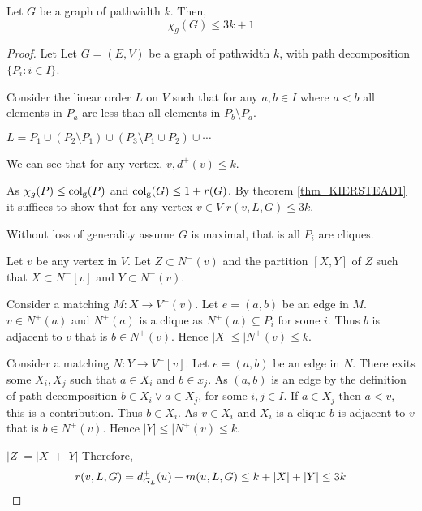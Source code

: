 \begin{theorem}\label{thm_pathwidth}
    Let $G$ be a graph of pathwidth $k$. Then, 
    \[\chi_g(G) \leq 3k + 1\]    
\end{theorem}

\begin{proof}
    Let Let $G=(E,V)$ be a graph of pathwidth $k$, with path decomposition $\{P_i:i\in I\}$. 

    Consider the linear order $L$ on $V$ such that for any $a,b\in I$ where $a<b$ all elements in $P_a$ are less than all elements in $P_b\setminus P_a$.  
        
    $ L = P_1 \cup (P_2 \setminus P_1) \cup  (P_3 \setminus P_1\cup P_2) \cup \dotsm$ 
    
    We can see that for any vertex, $v, d^+(v) \leq k$.
    
    As $\chi_g(P) \leq{\operatorname{col_g}}(P)$ and $\operatorname{col_g}(G)\leq 1+r(G)$. By theorem \ref{thm_KIERSTEAD1} it suffices to show that for any vertex $v \in V$ $r(v,L,G) \leq 3k$. 
    
    Without loss of generality assume $G$ is maximal, that is all $P_i$ are cliques.
    
    Let $v$ be any vertex in $V$. Let $Z \subset N^-(v)$ and the partition $[X,Y]$ of $Z$ such that $X\subset N^-[v]$ and  $Y\subset N^-(v)$. 
    
    Consider a matching $M\colon X \to V^+(v)$. Let $e=(a,b)$ be an edge in $M$. $v\in N^+(a)$ and $N^+(a)$ is a clique as $N^+(a) \subseteq P_i$ for some $i$. Thus $b$ is adjacent to $v$ that is $b\in N^+(v)$. Hence $|X|\leq|N^+(v)\leq k$. 
    
    Consider a matching $N\colon Y \to V^+[v]$. Let $e=(a,b)$ be an edge in $N$. %
    There exits some $X_i,X_j$ such that $a\in X_i$ and $b\in x_j$. As $(a,b)$ is an edge by the definition of path decomposition $b\in X_i \lor a\in X_j$, for some $i,j\in I$. If $a \in X_j$ then $a < v$, this is a contribution. Thus $b\in X_i$. As $v\in X_i$ and $X_i$ is a clique $b$ is adjacent to $v$ that is $b\in N^+(v)$. Hence $|Y|\leq|N^+(v)\leq k$.  
    
    $|Z| = |X|+|Y|$ Therefore, \[r(v,L,G) = d^+_{G_L}(u) + m(u,L,G) \leq k + |X|+|Y| \leq 3k\qedhere\]
\end{proof}
